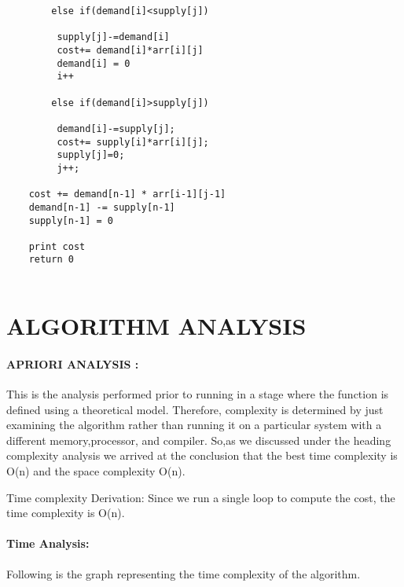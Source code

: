 \documentclass[10pt]{article}
\begin{document}
\begin{multicols*}{2}
\begin{lstlisting}
		else if(demand[i]<supply[j])
		
		 supply[j]-=demand[i]
		 cost+= demand[i]*arr[i][j]
		 demand[i] = 0
		 i++
				
		else if(demand[i]>supply[j])
		
		 demand[i]-=supply[j];
		 cost+= supply[i]*arr[i][j];
		 supply[j]=0;
		 j++;
    
    cost += demand[n-1] * arr[i-1][j-1]
    demand[n-1] -= supply[n-1]
    supply[n-1] = 0
	
	print cost
    return 0


\end{lstlisting}
    

\section*{ALGORITHM ANALYSIS} 
	
\paragraph{APRIORI ANALYSIS :}
This is the analysis performed prior to running in a stage where the function is defined using a theoretical model. Therefore, complexity is determined by just examining the algorithm rather than running it on a particular system with a different memory,processor, and compiler. So,as we discussed under the heading complexity analysis we arrived at the conclusion that the best time complexity is O(n) and the space complexity O(n).

Time complexity Derivation: Since we run a single loop to compute the cost, the time complexity is O(n).

\paragraph{Time Analysis:}Following is the graph representing the time complexity of the algorithm.\\\\\\
\end{multicols*}
\end{document}

